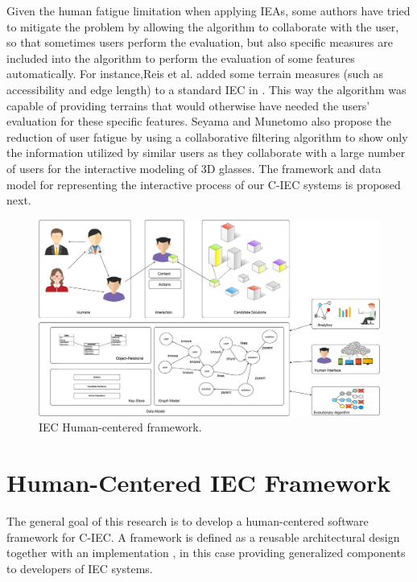 Given the human fatigue limitation when applying IEAs, some authors 
have tried to mitigate the problem by allowing the algorithm to 
collaborate with the user, so that sometimes 
users perform the evaluation,  but also specific measures are included 
into the algorithm to perform the
evaluation of some features automatically. For instance,Reis et al. added
some terrain measures (such as accessibility and edge length) 
to a standard  IEC in \cite{DBLP:journals/soco/FradeVC12}. 
This way the algorithm was capable of providing terrains that would otherwise have needed the
users' evaluation for these specific features. Seyama and Munetomo \cite{seyama2016development}
also propose the reduction of user fatigue by using 
a collaborative filtering algorithm to show only the information utilized by similar users as 
they collaborate with a large number of users for the interactive modeling of 3D glasses. 
The framework and data model for 
representing the interactive process of our C-IEC systems is proposed next.
\begin{figure}[!t]
    \centering
        \includegraphics[width=6in]{img/framework.eps}
    \caption{IEC Human-centered framework.}
    \label{fig:hc_framework}
\end{figure}

\section{Human-Centered IEC Framework}
\label{sec:framework}
The general goal of this research is to develop a human-centered \cite{gasson2003human} 
software framework for C-IEC. 
A framework is defined as a reusable architectural design together
with an implementation \cite{campbell1991choices}, in this case 
providing generalized components to developers of IEC systems. 

